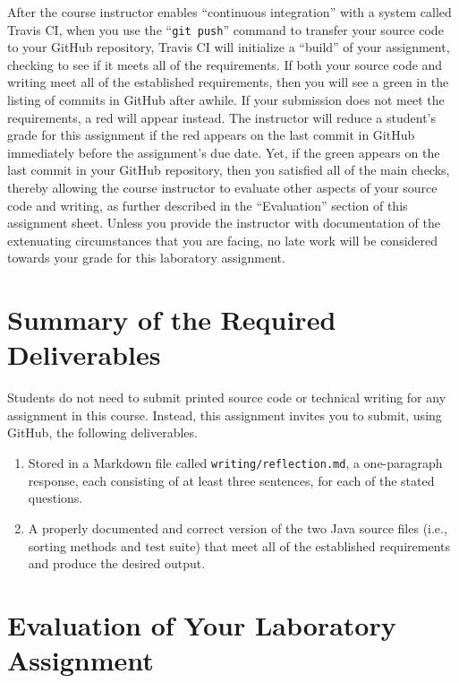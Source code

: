 \documentclass[11pt]{article}
\newcommand{\reflection}{\lstinline{writing/reflection.md}}
\newcommand{\gitpush}{\command{git push}}
\newcommand{\command}[1]{``\lstinline{#1}''}
\newcommand{\step}[1]{``{#1}''}
\newcommand{\checkmark}{\ding{51}}
\newcommand{\naughtmark}{\ding{55}}
\begin{document}
After the course instructor enables \step{continuous integration} with a system called Travis CI, when you use the
\gitpush{} command to transfer your source code to your GitHub repository, Travis CI will initialize a \step{build} of
your assignment, checking to see if it meets all of the requirements. If both your source code and writing meet all of
the established requirements, then you will see a green \checkmark{} in the listing of commits in GitHub after awhile.
If your submission does not meet the requirements, a red \naughtmark{} will appear instead. The instructor will reduce a
student's grade for this assignment if the red \naughtmark{} appears on the last commit in GitHub immediately before the
assignment's due date. Yet, if the green \checkmark{} appears on the last commit in your GitHub repository, then you
satisfied all of the main checks, thereby allowing the course instructor to evaluate other aspects of your source code
and writing, as further described in the \step{Evaluation} section of this assignment sheet. Unless you provide the
instructor with documentation of the extenuating circumstances that you are facing, no late work will be considered
towards your grade for this laboratory assignment.

\section*{Summary of the Required Deliverables}

\noindent Students do not need to submit printed source code or technical writing for any assignment in this course.
Instead, this assignment invites you to submit, using GitHub, the following deliverables.

\begin{enumerate}

  \setlength{\itemsep}{0in}

\item Stored in a Markdown file called \reflection{}, a one-paragraph response,
  each consisting of at least three sentences, for each of the stated questions.

\item A properly documented and correct version of the two Java source files
  (i.e., sorting methods and test suite) that meet all of the established
  requirements and produce the desired output.

\end{enumerate}

\section*{Evaluation of Your Laboratory Assignment}
\end{document}
